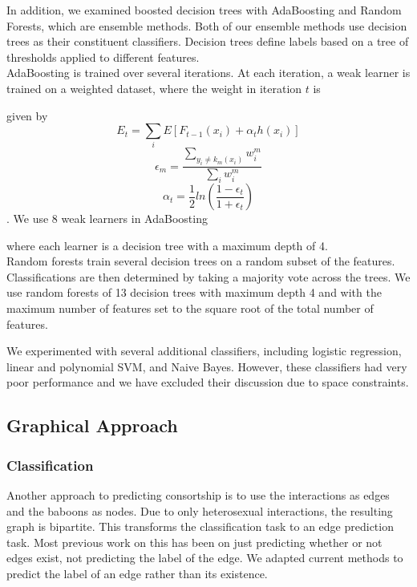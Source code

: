 \documentclass[twoside,twocolumn,paper=letter,fontsize=11pt]{article}
\begin{document}
In addition, we examined boosted decision trees with AdaBoosting and Random
Forests, which are ensemble methods. Both of our ensemble methods use decision
trees as their constituent classifiers. Decision trees define labels based on a
tree of thresholds applied to different features.\\

AdaBoosting is trained over several iterations. At each iteration, a weak
learner is trained on a weighted dataset, where the weight in iteration $t$ is

given by $$E_t=\sum_i E[F_{t-1}(x_i) + \alpha_t h(x_i)]$$
$$\epsilon_m = \frac{\sum_{y_i \ne k_m(x_i)} w_i^m}{\sum_i w_i^m}$$
$$\alpha_t=\frac{1}{2}ln(\frac{1-\epsilon_t}{1+\epsilon_t})$$. We use 8 weak learners in AdaBoosting

where each learner is a decision tree with a maximum depth of 4.\\

Random forests train several decision trees on a random subset of the features.
Classifications are then determined by taking a majority vote across the trees.
We use random forests of 13 decision trees with maximum depth 4 and with the
maximum number of features set to the square root of the total number of
features.

We experimented with several additional classifiers, including logistic
regression, linear and polynomial SVM, and Naive Bayes. However, these
classifiers had very poor performance and we have excluded their discussion due
to space constraints.

\subsection{Graphical Approach}

\subsubsection*{Classification}
Another approach to predicting consortship is to use the interactions as edges
and the baboons as nodes. Due to only heterosexual interactions, the resulting
graph is bipartite. This transforms the classification task to an edge
prediction task. Most previous work on this has been on just predicting whether
or not edges exist, not predicting the label of the edge. We adapted current
methods to predict the label of an edge rather than its existence.\\ 
\end{document}
